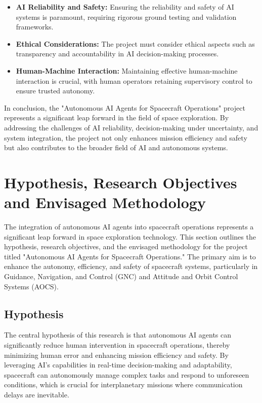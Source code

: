 \documentclass[a4paper, 11pt]{article}
\begin{document}
\begin{itemize}
    \item \textbf{AI Reliability and Safety:} Ensuring the reliability and safety of AI systems is paramount, requiring rigorous ground testing and validation frameworks.
    \item \textbf{Ethical Considerations:} The project must consider ethical aspects such as transparency and accountability in AI decision-making processes.
    \item \textbf{Human-Machine Interaction:} Maintaining effective human-machine interaction is crucial, with human operators retaining supervisory control to ensure trusted autonomy.
\end{itemize}

In conclusion, the "Autonomous AI Agents for Spacecraft Operations" project represents a significant leap forward in the field of space exploration. By addressing the challenges of AI reliability, decision-making under uncertainty, and system integration, the project not only enhances mission efficiency and safety but also contributes to the broader field of AI and autonomous systems.
\section{Hypothesis, Research Objectives and Envisaged Methodology}

The integration of autonomous AI agents into spacecraft operations represents a significant leap forward in space exploration technology. This section outlines the hypothesis, research objectives, and the envisaged methodology for the project titled "Autonomous AI Agents for Spacecraft Operations." The primary aim is to enhance the autonomy, efficiency, and safety of spacecraft systems, particularly in Guidance, Navigation, and Control (GNC) and Attitude and Orbit Control Systems (AOCS).

\subsection{Hypothesis}

The central hypothesis of this research is that autonomous AI agents can significantly reduce human intervention in spacecraft operations, thereby minimizing human error and enhancing mission efficiency and safety. By leveraging AI's capabilities in real-time decision-making and adaptability, spacecraft can autonomously manage complex tasks and respond to unforeseen conditions, which is crucial for interplanetary missions where communication delays are inevitable.
\end{document}
